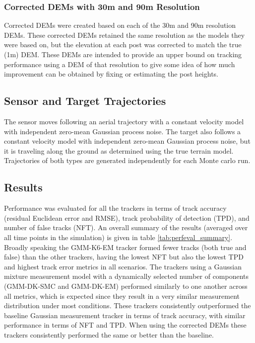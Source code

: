 \documentclass[journal]{IEEEtran}
\begin{document}
\subsubsection{Corrected DEMs with 30m and 90m Resolution}
Corrected DEMs were created based on each of the 30m and 90m resolution DEMs. These corrected DEMs retained the same resolution as the models they were based on, but the elevation at each post was corrected to match the true (1m) DEM. These DEMs are intended to provide an upper bound on tracking performance using a DEM of that resolution to give some idea of how much improvement can be obtained by fixing or estimating the post heights.

\subsection{Sensor and Target Trajectories}
The sensor moves following an aerial trajectory with a constant velocity model with independent zero-mean Gaussian process noise. The target also follows a constant velocity model with independent zero-mean Gaussian process noise, but it is traveling along the ground as determined using the true terrain model. Trajectories of both types are generated independently for each Monte carlo run.

\subsection{Results} \label{results}
Performance was evaluated for all the trackers in terms of track accuracy (residual Euclidean error and RMSE), track probability of detection (TPD), and number of false tracks (NFT). An overall summary of the results (averaged over all time points in the simulation) is given in table \ref{tab:perfeval_summary}. Broadly speaking the GMM-K6-EM tracker formed fewer tracks (both true and false) than the other trackers, having the lowest NFT but also the lowest TPD and highest track error metrics in all scenarios. The trackers using a Gaussian mixture measurement model with a dynamically selected number of components (GMM-DK-SMC and GMM-DK-EM) performed similarly to one another across all metrics, which is expected since they result in a very similar measurement distribution under most conditions. These trackers consistently outperformed the baseline Gaussian measurement tracker in terms of track accuracy, with similar performance in terms of NFT and TPD. When using the corrected DEMs these trackers consistently performed the same or better than the baseline.
\end{document}
